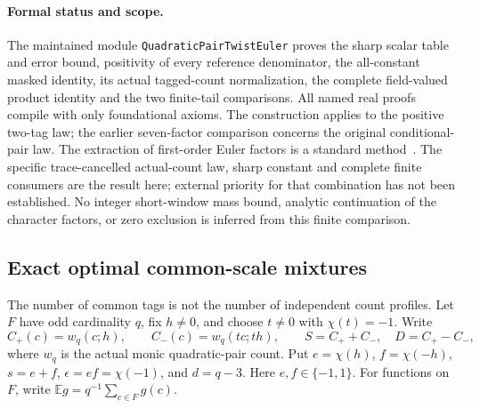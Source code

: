 \documentclass[11pt]{article}
\begin{document}
\paragraph{Formal status and scope.}
The maintained module \texttt{QuadraticPairTwistEuler} proves the sharp
scalar table and error bound, positivity of every reference denominator,
the all-constant masked identity, its actual tagged-count normalization,
the complete field-valued product identity and the two finite-tail
comparisons. All named real proofs compile with only foundational axioms.
The construction applies to the positive two-tag law; the earlier
seven-factor comparison concerns the original conditional-pair law.
The extraction of first-order Euler factors is a standard
method~\cite{Alberts}. The specific trace-cancelled actual-count law,
sharp constant and complete finite consumers are the result here;
external priority for that combination has not been established.
No integer short-window mass bound, analytic continuation of the
character factors, or zero exclusion is inferred from this finite
comparison.

\subsection{Exact optimal common-scale mixtures}

The number of common tags is not the number of independent count
profiles. Let \(F\) have odd cardinality \(q\), fix \(h\ne0\), and
choose \(t\ne0\) with \(\chi(t)=-1\). Write
\[
 C_+(c)=w_q(c;h),\qquad C_-(c)=w_q(tc;th),\qquad
 S=C_++C_-,\quad D=C_+-C_-,
\]
where \(w_q\) is the actual monic quadratic-pair count.
Put \(e=\chi(h)\), \(f=\chi(-h)\), \(s=e+f\),
\(\epsilon=ef=\chi(-1)\), and \(d=q-3\).
Here \(e,f\in\{-1,1\}\).
For functions on \(F\), write
\(\mathbb E g=q^{-1}\sum_{c\in F}g(c)\).
\end{document}
